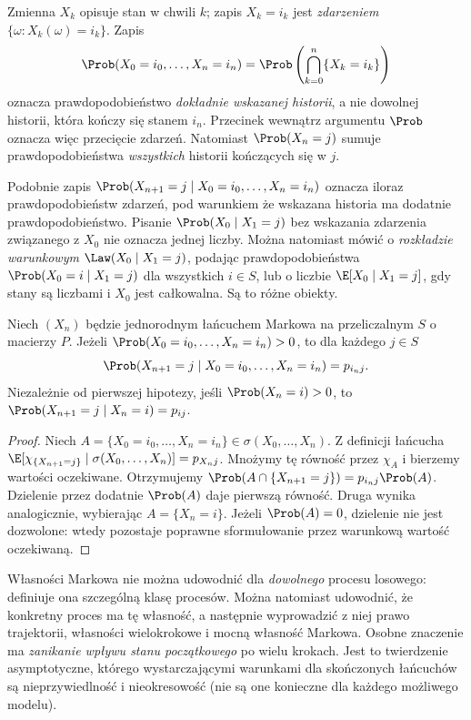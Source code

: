 \begin{uwaga}
Zmienna $X_k$ opisuje stan w chwili $k$; zapis
$X_k=i_k$ jest \emph{zdarzeniem} $\{\omega:X_k(\omega)=i_k\}$.
Zapis
\[
\Prob(X_0=i_0,\ldots,X_n=i_n)
=\Prob\left(\bigcap_{k=0}^n\{X_k=i_k\}\right)
\]
oznacza prawdopodobieństwo \emph{dokładnie wskazanej historii},
a nie dowolnej historii, która kończy się stanem $i_n$.
Przecinek wewnątrz argumentu $\Prob$ oznacza więc
przecięcie zdarzeń. Natomiast
$\Prob(X_n=j)$ sumuje prawdopodobieństwa \emph{wszystkich}
historii kończących się w $j$.

Podobnie zapis
$\Prob(X_{n+1}=j\mid X_0=i_0,\ldots,X_n=i_n)$
oznacza iloraz prawdopodobieństw zdarzeń, pod warunkiem
że wskazana historia ma dodatnie prawdopodobieństwo.
Pisanie $\Prob(X_0\mid X_1=j)$ bez wskazania zdarzenia
związanego z $X_0$ nie oznacza jednej liczby.
Można natomiast mówić o \emph{rozkładzie warunkowym}
$\Law(X_0\mid X_1=j)$, podając prawdopodobieństwa
$\Prob(X_0=i\mid X_1=j)$ dla wszystkich $i\in S$,
lub o liczbie $\E[X_0\mid X_1=j]$, gdy stany są liczbami
i $X_0$ jest całkowalna. Są to różne obiekty.
\end{uwaga}

\begin{stwierdzenie}
Niech $(X_n)$ będzie jednorodnym łańcuchem Markowa
na przeliczalnym $S$ o macierzy $P$. Jeżeli
$\Prob(X_0=i_0,\ldots,X_n=i_n)>0$, to dla każdego $j\in S$
\[
\Prob(X_{n+1}=j\mid X_0=i_0,\ldots,X_n=i_n)=p_{i_nj}.
\]
Niezależnie od pierwszej hipotezy, jeśli
$\Prob(X_n=i)>0$, to
$\Prob(X_{n+1}=j\mid X_n=i)=p_{ij}$.
\end{stwierdzenie}
\begin{proof}
Niech $A=\{X_0=i_0,\ldots,X_n=i_n\}\in
\sigma(X_0,\ldots,X_n)$. Z definicji łańcucha
$\E[\chi_{\{X_{n+1}=j\}}\mid
\sigma(X_0,\ldots,X_n)]=p_{X_nj}$.
Mnożymy tę równość przez $\chi_{A}$ i bierzemy
wartości oczekiwane. Otrzymujemy
$\Prob(A\cap\{X_{n+1}=j\})=p_{i_nj}\Prob(A)$.
Dzielenie przez dodatnie $\Prob(A)$ daje pierwszą
równość. Druga wynika analogicznie, wybierając
$A=\{X_n=i\}$. Jeżeli $\Prob(A)=0$, dzielenie
nie jest dozwolone: wtedy pozostaje poprawne
sformułowanie przez warunkową wartość oczekiwaną.
\end{proof}

\begin{uwaga}
Własności Markowa nie można udowodnić dla \emph{dowolnego}
procesu losowego: definiuje ona szczególną klasę procesów.
Można natomiast udowodnić, że konkretny proces ma tę własność,
a następnie wyprowadzić z niej prawo trajektorii,
własności wielokrokowe i mocną własność Markowa.
Osobne znaczenie ma \emph{zanikanie wpływu stanu początkowego}
po wielu krokach. Jest to twierdzenie asymptotyczne,
którego wystarczającymi warunkami dla skończonych
łańcuchów są nieprzywiedlność i nieokresowość
(nie są one konieczne dla każdego możliwego modelu).
\end{uwaga}

